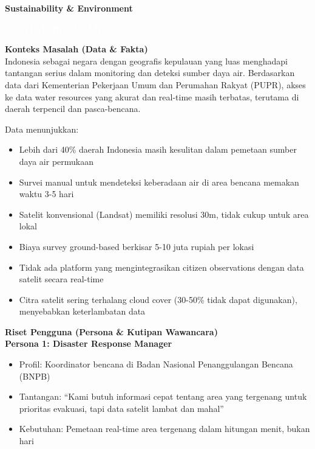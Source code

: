 \documentclass[12pt,a4paper]{article}
\newcommand{\sectionbox}[1]{%
  \colorbox{samsungblue}{%
    \parbox{\textwidth}{%
      \textcolor{white}{\large\bfseries #1}%
    }%
  }%
}
\newcommand{\subsectionbox}[1]{%
  \textbf{\large #1}\\[0.3cm]
}
\begin{document}
\vspace{0.5cm}

\textbf{Sustainability \& Environment}

\vspace{1cm}

\sectionbox{3. LATAR BELAKANG}

\vspace{0.5cm}

\subsectionbox{Konteks Masalah (Data \& Fakta)}

Indonesia sebagai negara dengan geografis kepulauan yang luas menghadapi tantangan serius dalam monitoring dan deteksi sumber daya air. Berdasarkan data dari Kementerian Pekerjaan Umum dan Perumahan Rakyat (PUPR), akses ke data water resources yang akurat dan real-time masih terbatas, terutama di daerah terpencil dan pasca-bencana.

Data menunjukkan:
\begin{itemize}
  \item Lebih dari 40\% daerah Indonesia masih kesulitan dalam pemetaan sumber daya air permukaan
  \item Survei manual untuk mendeteksi keberadaan air di area bencana memakan waktu 3-5 hari
  \item Satelit konvensional (Landsat) memiliki resolusi 30m, tidak cukup untuk area lokal
  \item Biaya survey ground-based berkisar 5-10 juta rupiah per lokasi
  \item Tidak ada platform yang mengintegrasikan citizen observations dengan data satelit secara real-time
  \item Citra satelit sering terhalang cloud cover (30-50\% tidak dapat digunakan), menyebabkan keterlambatan data
\end{itemize}

\subsectionbox{Riset Pengguna (Persona \& Kutipan Wawancara)}

\textbf{Persona 1: Disaster Response Manager}
\begin{itemize}
  \item Profil: Koordinator bencana di Badan Nasional Penanggulangan Bencana (BNPB)
  \item Tantangan: ``Kami butuh informasi cepat tentang area yang tergenang untuk prioritas evakuasi, tapi data satelit lambat dan mahal''
  \item Kebutuhan: Pemetaan real-time area tergenang dalam hitungan menit, bukan hari
\end{itemize}
\end{document}
